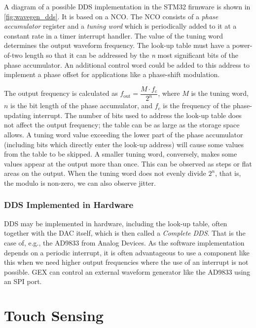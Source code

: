 A diagram of a possible \gls{DDS} implementation in the STM32 firmware is shown in \cref{fig:wavegen_dds}. It is based on a \gls{NCO}. The \gls{NCO} consists of a \textit{phase accumulator} register and a \textit{tuning word} which is periodically added to it at a constant rate in a timer interrupt handler. The value of the tuning word determines the output waveform frequency. The look-up table must have a power-of-two length so that it can be addressed by the \textit{n} most significant bits of the phase accumulator. An additional control word could be added to this address to implement a phase offset for applications like a phase-shift modulation.

The output frequency is calculated as \(f_\mathrm{out} = \dfrac{M\cdot f_\mathrm{c}}{2^n}\), where $M$ is the tuning word, $n$ is the bit length of the phase accumulator, and $f_c$ is the frequency of the phase-updating interrupt. The number of bits used to address the look-up table does not affect the output frequency; the table can be as large as the storage space allows. A tuning word value exceeding the lower part of the phase accumulator (including bits which directly enter the look-up address) will cause some values from the table to be skipped. A smaller tuning word, conversely, makes some values appear at the output more than once. This can be observed as steps or flat areas on the output. When the tuning word does not evenly divide $2^n$, that is, the modulo is non-zero, we can also observe jitter.

\subsubsection{DDS Implemented in Hardware}

DDS may be implemented in hardware, including the look-up table, often together with the \gls{DAC} itself, which is then called a \textit{Complete \gls{DDS}}. That is the case of, e.g., the AD9833 from Analog Devices. As the software implementation depends on a periodic interrupt, it is often advantageous to use a component like this when we need higher output frequencies where the use of an interrupt is not possible. GEX can control an external waveform generator like the AD9833 using an \gls{SPI} port.

\section{Touch Sensing} \label{sec:theory_touch}

